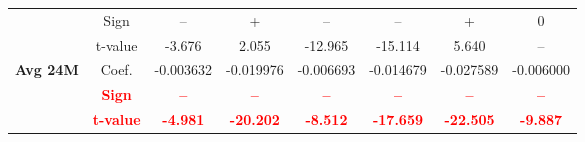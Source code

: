 \documentclass[11pt,english,a4paper,hidelinks]{book}
\begin{document}
\begin{table}[H]
\begin{tabular}{lccccccc}
            & Sign    & –         & +         & –         & –         & +         & 0         \\
            & t-value & -3.676    & 2.055     & -12.965   & -15.114   & 5.640     & --        \\
        \cmidrule{1-8}
        \multirow{3}{*}{\textbf{Avg 24M}}
            & Coef.   & -0.003632 & -0.019976 & -0.006693 & -0.014679 & -0.027589 & -0.006000 \\
            & \textbf{\textcolor{red}{Sign}}
                     & \textbf{\textcolor{red}{–}}
                     & \textbf{\textcolor{red}{–}}
                     & \textbf{\textcolor{red}{–}}
                     & \textbf{\textcolor{red}{–}}
                     & \textbf{\textcolor{red}{–}}
                     & \textbf{\textcolor{red}{–}} \\
            & \textbf{\textcolor{red}{t-value}}
                     & \textbf{\textcolor{red}{-4.981}}
                     & \textbf{\textcolor{red}{-20.202}}
                     & \textbf{\textcolor{red}{-8.512}}
                     & \textbf{\textcolor{red}{-17.659}}
                     & \textbf{\textcolor{red}{-22.505}}
                     & \textbf{\textcolor{red}{-9.887}} \\
        \bottomrule
    \end{tabular}
    \label{tab:europe_value_consistency}
\end{table}


\end{document}
